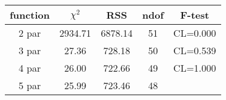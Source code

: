 \begin{tabular}{c|c|c|c|c}
function & $\chi^2$ & RSS & ndof & F-test \\
\hline
2 par & 2934.71 & 6878.14 & 51 & CL=0.000 \\
3 par & 27.36 & 728.18 & 50 & CL=0.539 \\
4 par & 26.00 & 722.66 & 49 & CL=1.000 \\
5 par & 25.99 & 723.46 & 48 & \\
\hline
\end{tabular}